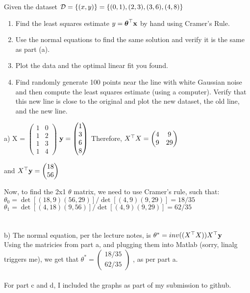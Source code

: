 \documentclass[12pt,letterpaper]{hmcpset}
\begin{document}
\begin{problem}[2]
Given the dataset ${\cal D} = \{(x,y)\} = \{(0,1), (2,3), (3,6), (4,8)\}$
\begin{enumerate}
   \item Find the least squares estimate $y = \hbox{\boldmath$\theta$}^\top{\bf x}$ by hand using
        Cramer's Rule.
    \item Use the normal equations to find the same solution and verify it
        is the same as part (a).
    \item Plot the data and the optimal linear fit you found.
    \item Find randomly generate 100 points near the line with white Gaussian
        noise and then compute the least squares estimate (using a computer).
        Verify that this new line is close to the original and plot the new
        dataset, the old line, and the new line.
\end{enumerate}

\end{problem}
\begin{solution}
 a) X = $\begin{pmatrix}				
1 & 0 \\								
1 & 2 \\
1 & 3 \\
1 & 4 
\end{pmatrix}$  
${\bf y} = \begin{pmatrix} 
1 \\
3\\
6\\
8
\end{pmatrix}$
Therefore, $X^\top X = \begin{pmatrix}
4 & 9 \\
9 & 29 \\
\end{pmatrix}$
\end{solution} and $X^\top {\bf y} = \begin{pmatrix}
18\\
56
\end{pmatrix}$

Now, to find the 2x1 $\theta $ matrix, we need to use Cramer's rule, such that: \\

$\theta_0 = \det[(18, 9)(56, 29)] / \det[(4, 9)(9, 29)]  = 18/35  $ \\
$\theta_1 = \det[(4, 18)(9, 56)] / \det[(4, 9)(9, 29)]  = 62/35  $ \\
\\
\\
b) The normal equation, per the lecture notes, is $\theta^* = inv((X^\top X)) X ^\top {\bf y}        $\\
Using the matricies from part a, and plugging them into Matlab (sorry, linalg triggers me), we get that $\theta^* = \begin{pmatrix} 18/35 \\ 62/35 \end{pmatrix}$ , as per part a.\\ \\ 

For part c and d, I included the graphs as part of my submission to github.

\newpage
\end{document}
